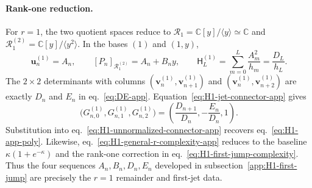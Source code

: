 \documentclass[a4paper,11pt]{article}
\def\ee{e}%
\theoremstyle{definition}
\theoremstyle{remark}
\newcommand{\ee}{\mathrm e}
\newcommand{\CC}{\mathbb C}
\begin{document}
\paragraph{Rank-one reduction.}
For $r=1$, the two quotient spaces reduce to $\mathscr R_1=\CC[y]/\langle y\rangle\simeq\CC$ and $\mathscr R_1^{(2)}=\CC[y]/\langle y^2\rangle$. In the bases $(1)$ and $(1,y)$,
\begin{equation}
   \mathbf u_n^{(1)}=A_n,\qquad
   [P_n]_{\mathscr R_1^{(2)}}=A_n+B_ny,\qquad
   \mathsf H_L^{(1)}=\sum_{m=0}^{L}\frac{A_m^2}{h_m}
   =\frac{D_L}{h_L}.
   \label{eq:H1-r1-residue-reduction-app}
\end{equation}
The $2\times2$ determinants with columns $(\mathbf v_n^{(1)},\mathbf v_{n+1}^{(1)})$ and $(\mathbf v_n^{(1)},\mathbf v_{n+2}^{(1)})$ are exactly $D_n$ and $E_n$ in eq.~\eqref{eq:DE-app}. Equation~\eqref{eq:H1-jet-connector-app} gives
\begin{equation}
   \bigl(G_{n,0}^{(1)},G_{n,1}^{(1)},G_{n,2}^{(1)}\bigr)
   =\left(\frac{D_{n+1}}{D_n},-\frac{E_n}{D_n},1\right).
   \label{eq:H1-r1-G-reduction-app}
\end{equation}
Substitution into eq.~\eqref{eq:H1-unnormalized-connector-app} recovers eq.~\eqref{eq:H1-app-poly}. Likewise, eq.~\eqref{eq:H1-general-r-complexity-app} reduces to the baseline $\kappa(1+\ee^{-\kappa})$ and the rank-one correction in eq.~\eqref{eq:H1-first-jump-complexity}. Thus the four sequences $A_n,B_n,D_n,E_n$ developed in subsection~\ref{app:H1-first-jump} are precisely the $r=1$ remainder and first-jet data.
\end{document}
